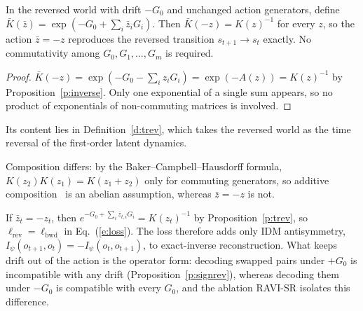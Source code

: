 \documentclass{jcse}
\newcommand{\method}{RAVI}
\newcommand{\zb}{\bar{z}}
\begin{document}
\begin{proposition}
\label{p:trev}
In the reversed world with drift $-G_0$ and unchanged action generators, define $\bar K(\zb)=\exp(-G_0+\sum_i\zb_iG_i)$.
Then $\bar K(-z)=K(z)^{-1}$ for every $z$, so the action $\zb=-z$ reproduces the reversed transition $s_{t+1}\to s_t$ exactly.
No commutativity among $G_0,G_1,\dots,G_m$ is required.
\end{proposition}
\begin{proof}
$\bar K(-z)=\exp(-G_0-\sum_iz_iG_i)=\exp(-A(z))=K(z)^{-1}$ by Proposition~\ref{p:inverse}.
Only one exponential of a single sum appears, so no product of exponentials of non-commuting matrices is involved.
\end{proof}
Its content lies in Definition~\ref{d:trev}, which takes the reversed world as the time reversal of the first-order latent dynamics.

\begin{remark}
Composition differs: by the Baker--Campbell--Hausdorff formula, $K(z_2)K(z_1)=K(z_1+z_2)$ only for commuting generators, so additive composition~\cite{wei2026aclam} is an abelian assumption, whereas $\zb=-z$ is not.
\end{remark}

\begin{remark}
\label{r:reduce}
If $\zb_t=-z_t$, then $e^{-G_0+\sum_i\zb_{t,i}G_i}=K(z_t)^{-1}$ by Proposition~\ref{p:trev}, so $\ell_{\mathrm{rev}}=\ell_{\mathrm{bwd}}$ in Eq.~(\ref{e:loss}).
The loss therefore adds only IDM antisymmetry, $I_\psi(o_{t+1},o_t)=-I_\psi(o_t,o_{t+1})$, to exact-inverse reconstruction.
What keeps drift out of the action is the operator form: decoding swapped pairs under $+G_0$ is incompatible with any drift (Proposition~\ref{p:signrev}), whereas decoding them under $-G_0$ is compatible with every $G_0$, and the ablation {\method}-SR isolates this difference.
\end{remark}
\end{document}
